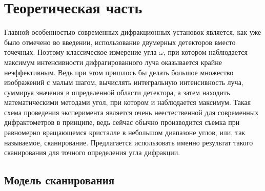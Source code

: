\section{Теоретическая часть}

Главной особенностью современных дифракционных установок является, как уже было отмечено во введении, использование двумерных детекторов вместо точечных.
Поэтому классическое измерение угла $\omega$, при котором наблюдается максимум интенсивности дифрагированного луча оказывается крайне неэффективным.
Ведь при этом пришлось бы делать большое множество изображений с малым шагом, вычислять интегральную интенсивность луча, суммируя значения в определенной области детектора, а затем находить математическими методами угол, при котором и наблюдается максимум.
Такая схема проведения эксперимента является очень неестественной для современных дифрактометров в принципе, ведь сейчас обычно производится съемка при равномерно вращающемся кристалле в небольшом диапазоне углов, или, так называемое, сканирование.
Предлагается использовать именно результат такого сканирования для точного определения угла дифракции.

\subsection{Модель сканирования}

